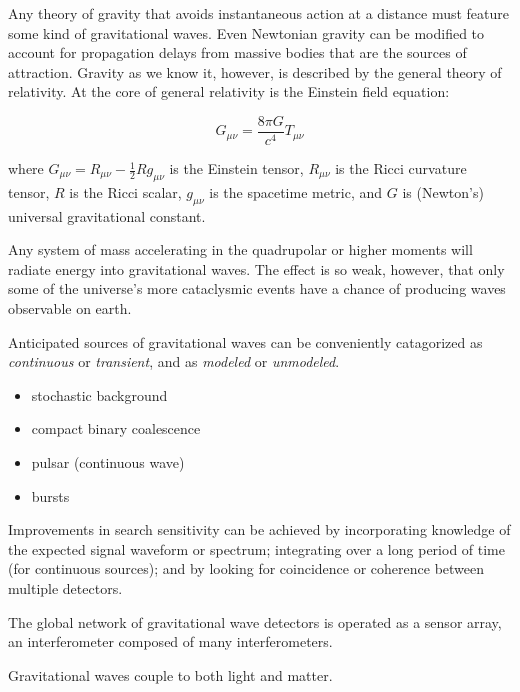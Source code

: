 \label{chapter1}
\doublespace
{}

Any theory of gravity that avoids instantaneous action at a distance
must feature some kind of gravitational waves.  Even Newtonian gravity
can be modified to account for propagation delays from massive bodies
that are the sources of attraction.  Gravity as we know it, however, is
described by the general theory of relativity. At the core of general
relativity is the Einstein field equation:

\begin{equation}
G_{\mu\nu} = \frac {8\pi G}{c^4} T_{\mu\nu}
\end{equation}

where $G_{\mu\nu} = R_{\mu\nu} - \frac{1}{2} R g_{\mu\nu}$ is the
Einstein tensor, $R_{\mu\nu}$ is the Ricci curvature tensor, $R$ is
the Ricci scalar, $g_{\mu\nu}$ is the spacetime metric, and $G$ is
(Newton's) universal gravitational constant.

Any system of mass accelerating in the quadrupolar or higher moments
will radiate energy into gravitational waves.  The effect is so weak,
however, that only some of the universe's more cataclysmic events have
a chance of producing waves observable on earth.

Anticipated sources of gravitational waves can be conveniently
catagorized as \emph{continuous} or \emph{transient}, and as
\emph{modeled} or \emph{unmodeled}.

\begin{itemize}
\item stochastic background
\item compact binary coalescence
\item pulsar (continuous wave)
\item bursts
\end{itemize}

Improvements in search sensitivity can be achieved by incorporating
knowledge of the expected signal waveform or spectrum; integrating
over a long period of time (for continuous sources); and by looking
for coincidence or coherence between multiple detectors.

The global network of gravitational wave detectors is operated as a
sensor array, an interferometer composed of many interferometers.

Gravitational waves couple to both light and matter.

